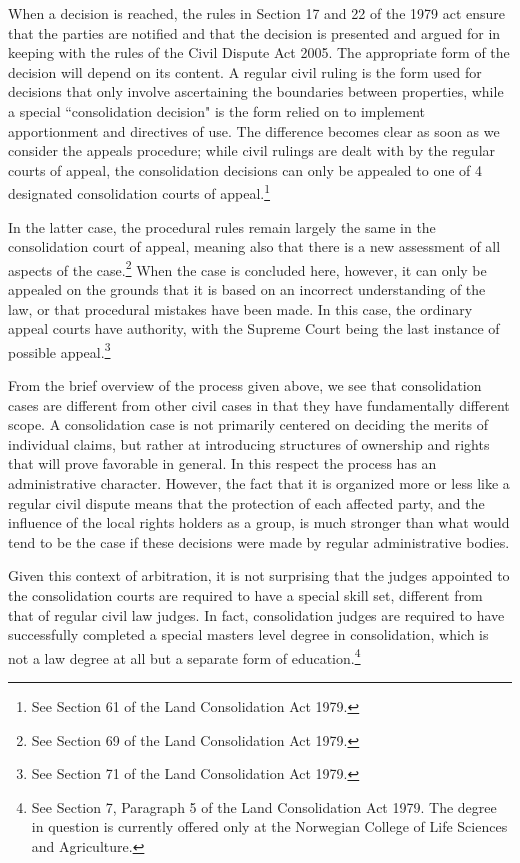 \documentclass[10pt]{article} %
\begin{document}
When a decision is reached, the rules in Section 17 and 22 of the 1979 act ensure that the parties are notified and that the decision is presented and argued for in keeping with the rules of the Civil Dispute Act 2005. The appropriate form of the decision will depend on its content. A regular civil ruling is the form used for decisions that only involve ascertaining the boundaries between properties, while a special ``consolidation decision" is the form relied on to implement apportionment and directives of use. The difference becomes clear as soon as we consider the appeals procedure; while civil rulings are dealt with by the regular courts of appeal, the consolidation decisions can only be appealed to one of 4 designated consolidation courts of appeal.\footnote{See Section 61 of the Land Consolidation Act 1979.} 

In the latter case, the procedural rules remain largely the same in the consolidation court of appeal, meaning also that there is a new assessment of all aspects of the case.\footnote{See Section 69 of the Land Consolidation Act 1979.} When the case is concluded here, however, it can only be appealed on the grounds that it is based on an incorrect understanding of the law, or that procedural mistakes have been made. In this case, the ordinary appeal courts have authority, with the Supreme Court being the last instance of possible appeal.\footnote{See Section 71 of the Land Consolidation Act 1979.}

From the brief overview of the process given above, we see that consolidation cases are different from other civil cases in that they have fundamentally different scope. A consolidation case is not primarily centered on deciding the merits of individual claims, but rather at introducing structures of ownership and rights that will prove favorable in general. In this respect the process has an administrative character. However, the fact that it is organized more or less like a regular civil dispute means that the protection of each affected party, and the influence of the local rights holders as a group, is much stronger than what would tend to be the case if these decisions were made by regular administrative bodies.

Given this context of arbitration, it is not surprising that the judges appointed to the consolidation courts are required to have a special skill set, different from that of regular civil law judges. In fact, consolidation judges are required to have successfully completed a special masters level degree in consolidation, which is not a law degree at all but a separate form of education.\footnote{See Section 7, Paragraph 5 of the Land Consolidation Act 1979. The degree in question is currently offered only at the Norwegian College of Life Sciences and Agriculture.} 
\end{document}
